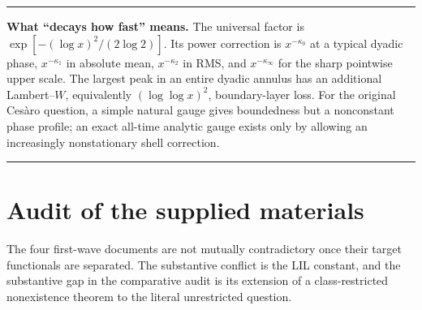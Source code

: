 \documentclass[11pt]{article}
\theoremstyle{definition}
\theoremstyle{remark}
\newenvironment{verdict}{%
  \par\medskip\noindent\begin{center}\begin{minipage}{0.94\textwidth}\hrule\vspace{0.65em}\small
}{%
  \vspace{0.65em}\hrule\end{minipage}\end{center}\medskip
}
\begin{document}
\begin{verdict}
\textbf{What ``decays how fast'' means.}
The universal factor is
\(\exp[-(\log x)^2/(2\log2)]\).  Its power correction is
\(x^{-\kappa_0}\) at a typical dyadic phase,
\(x^{-\kappa_1}\) in absolute mean,
\(x^{-\kappa_2}\) in RMS, and
\(x^{-\kappa_\infty}\) for the sharp pointwise upper scale.
The largest peak in an entire dyadic annulus has an additional
Lambert--\(W\), equivalently \((\log\log x)^2\), boundary-layer loss.
For the original Ces\`aro question, a simple natural gauge gives boundedness
but a nonconstant phase profile; an exact all-time analytic gauge exists only
by allowing an increasingly nonstationary shell correction.
\end{verdict}

\section{Audit of the supplied materials}

The four first-wave documents are not mutually contradictory once their target
functionals are separated.  The substantive conflict is the LIL constant, and
the substantive gap in the comparative audit is its extension of a
class-restricted nonexistence theorem to the literal unrestricted question.
\end{document}
